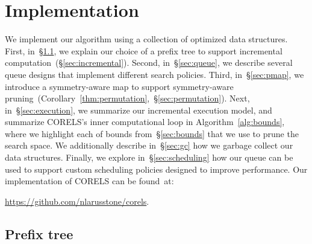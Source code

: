

\section{Implementation}
\label{sec:implementation}

We implement our algorithm using a collection of optimized data structures.
%
First, in~\S\ref{sec:trie}, we explain our choice of a prefix tree
to support incremental computation~(\S\ref{sec:incremental}).
%
Second, in~\S\ref{sec:queue}, we describe several queue designs
that implement different search policies.
%
Third, in~\S\ref{sec:pmap}, we introduce a symmetry-aware map to support
symmetry-aware pruning~(Corollary~\ref{thm:permutation},~\S\ref{sec:permutation}).
%
Next, in~\S\ref{sec:execution}, we summarize our incremental execution model,
and summarize CORELS's inner computational loop in Algorithm~\ref{alg:bounds},
where we highlight each of bounds from~\S\ref{sec:bounds} that we use to prune the search space.
%
We additionally describe in~\S\ref{sec:gc} how we garbage collect our data structures.
%
Finally, we explore in~\S\ref{sec:scheduling} how our queue can be used to support
custom scheduling policies designed to improve performance.
%
Our implementation of CORELS can be found~at: \\

\centerline{\url{https://github.com/nlarusstone/corels}.}

\subsection{Prefix tree}
\label{sec:trie}

